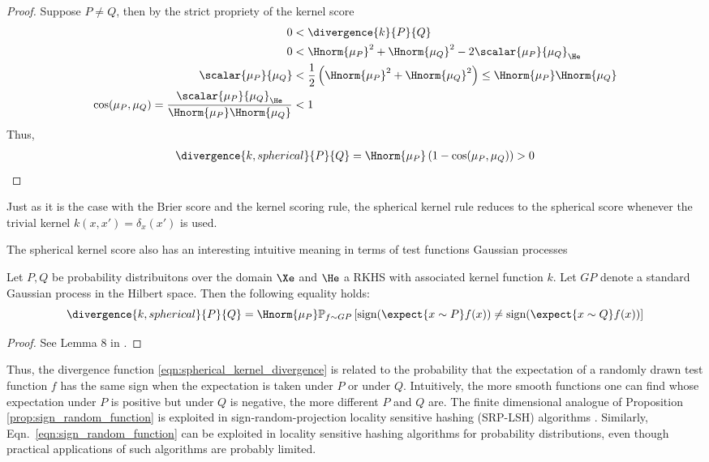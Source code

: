 \begin{theorem} 
\begin{proof}
	Suppose $P\neq Q$, then by the strict propriety of the kernel score
	\begin{align}
		0 &< \divergence{k}{P}{Q}\\
		0 &< \Hnorm{\mu_P}^2 + \Hnorm{\mu_Q}^2 - 2\scalar{\mu_P}{\mu_Q} _{\He}\\
		\scalar{\mu_P}{\mu_Q} &< \frac{1}{2}\left(\Hnorm{\mu_P}^2 + \Hnorm{\mu_Q}^2\right) \leq \Hnorm{\mu_P}\Hnorm{\mu_Q}\\
		\cos(\mu_P,\mu_Q) = \frac{\scalar{\mu_P}{\mu_Q} _{\He}}{\Hnorm{\mu_P}\Hnorm{\mu_Q}} &< 1
	\end{align}
	Thus,
	\begin{align}
		\divergence{k,spherical}{P}{Q} = \Hnorm{\mu_P} \left( 1 - \cos(\mu_P, \mu_Q)\right) > 0
	\end{align}
\end{proof}
\end{theorem}

Just as it is the case with the Brier score and the kernel scoring rule, the spherical kernel rule reduces to the spherical score whenever the trivial kernel $k(x,x') = \delta_{x}(x')$ is used.

The spherical kernel score also has an interesting intuitive meaning in terms of test functions Gaussian processes

\begin{proposition}\label{prop:sign_random_function}
Let $P,Q$ be probability distribuitons over the domain $\Xe$ and $\He$ a RKHS with associated kernel function $k$. Let $GP$ denote a standard Gaussian process in the Hilbert space. Then the following equality holds:
\begin{equation}
	 \divergence{k,spherical}{P}{Q} = \Hnorm{\mu_P} \mathbb{P}_{f\sim GP} \left[ \mbox{sign}(\expect{x\sim P} f(x)) \neq \mbox{sign}(\expect{x\sim Q} f(x)) \right] \label{eqn:sign_random_function}
\end{equation}
\begin{proof}
See Lemma 8 in \citep{Goemans1995}.
\end{proof}
\end{proposition}

Thus, the divergence function \eqref{eqn:spherical_kernel_divergence} is related to the probability that the expectation of a randomly drawn test function $f$ has the same sign when the expectation is taken under $P$ or under $Q$. Intuitively, the more smooth functions one can find whose expectation under $P$ is positive but under $Q$ is negative, the more different $P$ and $Q$ are. The finite dimensional analogue of Proposition \ref{prop:sign_random_function} is exploited in sign-random-projection locality sensitive hashing (SRP-LSH) algorithms \citep{Charikar2002,Ji2012}. Similarly, Eqn.\ \eqref{eqn:sign_random_function} can be exploited in locality sensitive hashing algorithms for probability distributions, even though practical applications of such algorithms are probably limited.

